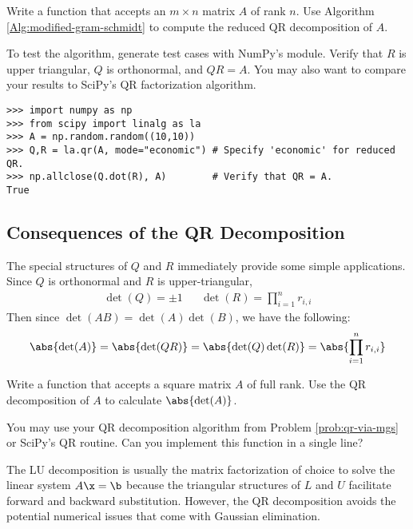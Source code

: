 \begin{problem} %
Write a function that accepts an $m \times n$ matrix $A$ of rank $n$.
Use Algorithm \ref{Alg:modified-gram-schmidt} to compute the reduced QR decomposition of $A$.

To test the algorithm, generate test cases with NumPy's  module.
Verify that $R$ is upper triangular, $Q$ is orthonormal, and $QR = A$.
You may also want to compare your results to SciPy's QR factorization algorithm.

\begin{lstlisting}
>>> import numpy as np
>>> from scipy import linalg as la
>>> A = np.random.random((10,10))
>>> Q,R = la.qr(A, mode="economic") # Specify 'economic' for reduced QR.
>>> np.allclose(Q.dot(R), A)        # Verify that QR = A.
True
\end{lstlisting}
\label{prob:qr-via-mgs}
\end{problem}

\subsection*{Consequences of the QR Decomposition} %

The special structures of $Q$ and $R$ immediately provide some simple applications.
Since $Q$ is orthonormal and $R$ is upper-triangular,
\begin{align*} \det(Q) = \pm 1 && \det(R) = \prod_{i=1}^n r_{i,i} \end{align*}
Then since $\det(AB) = \det(A)\det(B)$, we have the following:
\[\abs{\det(A)} = \abs{\det(QR)} = \abs{\det(Q)\det(R)} = \abs{\prod_{i=1}^n r_{i,i}}\]

\begin{problem} %
Write a function that accepts a square matrix $A$ of full rank.
Use the QR decomposition of $A$ to calculate $\abs{\det(A)}$.

You may use your QR decomposition algorithm from Problem \ref{prob:qr-via-mgs} or SciPy's QR routine.
Can you implement this function in a single line?
\end{problem}

The LU decomposition is usually the matrix factorization of choice to solve the linear system $A\x = \b$ because the triangular structures of $L$ and $U$ facilitate forward and backward substitution.
However, the QR decomposition avoids the potential numerical issues that come with Gaussian elimination.

